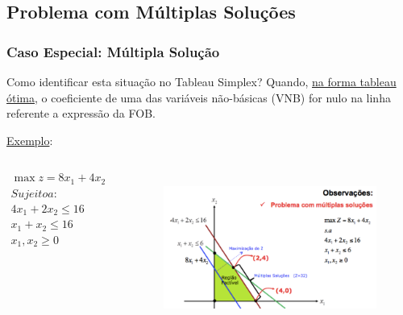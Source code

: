 \documentclass{beamer}
\begin{document}
\subsection{Problema com Múltiplas Soluções} 
\begin{frame}
	\frametitle{Caso Especial: Múltipla Solução}
	\begin{block}{Como identificar esta situação no Tableau Simplex?}
			Quando, {\color{red}\underline{na forma tableau ótima}}, o coeficiente de uma das variáveis não-básicas (VNB) for nulo na linha referente a expressão da FOB. 
	\end{block} \pause
	\underline{Exemplo}:
	\begin{columns}
		\begin{column}{4cm}
			\begin{mdframed}[backgroundcolor=black!10]
				$	\begin{matrix}
						\max z = 8x_1 + 4x_2 \\
						Sujeito a: \\
						4x_1 + 2x_2 \le 16 \\
						x_1 + x_2 \le 16 \\
						x_1, x_2 \ge 0 \\
					\end{matrix}
				$
			\end{mdframed}
		\end{column} \pause
		\begin{column}{6.5cm}
			\includegraphics[width=7cm,height=5cm]{prob_multsol.png}
		\end{column}
	\end{columns}
	
\end{frame}
\end{document}
